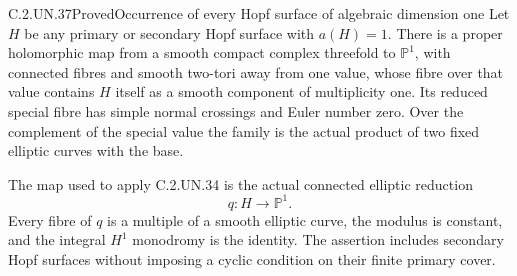 \begin{statement}{C.2.UN.37}{Proved}{Occurrence of every Hopf surface of algebraic dimension one}
Let $H$ be any primary or secondary Hopf surface with $a(H)=1$.
There is a proper holomorphic map from a smooth compact complex
threefold to $\mathbb P^1$, with connected fibres and smooth
two-tori away from one value, whose fibre over that value contains
$H$ itself as a smooth component of multiplicity one. Its reduced
special fibre has simple normal crossings and Euler number zero.
Over the complement of the special value the family is the
actual product of two fixed elliptic curves with the base.

The map used to apply C.2.UN.34 is the actual connected elliptic
reduction
\[
                         q:H\longrightarrow\mathbb P^1.
\tag{C.EH.1}
\]
Every fibre of $q$ is a multiple of a smooth elliptic curve,
the modulus is constant, and the integral $H^1$ monodromy is
the identity. The assertion includes secondary Hopf surfaces
without imposing a cyclic condition on their finite primary cover.
\end{statement}

